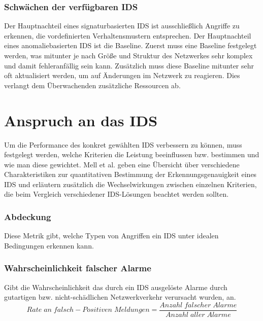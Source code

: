 \subsubsection{Schwächen der verfügbaren IDS}
Der Hauptnachteil eines signaturbasierten IDS ist ausschließlich Angriffe zu erkennen, die vordefinierten Verhaltensmustern entsprechen. Der Hauptnachteil eines anomaliebasierten IDS ist die Baseline. Zuerst muss eine Baseline festgelegt werden, was mitunter je nach Größe und Struktur des Netzwerkes sehr komplex und damit fehleranfällig sein kann. Zusätzlich muss diese Baseline mitunter sehr oft aktualisiert werden, um auf Änderungen im Netzwerk zu reagieren. Dies verlangt dem Überwachenden zusätzliche Ressourcen ab.
\section{Anspruch an das IDS}
Um die Performance des konkret gewählten IDS verbessern zu können, muss festgelegt werden, welche Kriterien die Leistung beeinflussen bzw. bestimmen und wie man diese gewichtet.
Mell et al. \cite{mell2003overview} geben eine Übersicht über verschiedene Charakteristiken zur quantitativen Bestimmung der Erkennungsgenauigkeit eines IDS und erläutern zusätzlich die Wechselwirkungen zwischen einzelnen Kriterien, die beim Vergleich verschiedener IDS-Lösungen beachtet werden sollten.
\subsubsection{Abdeckung}
Diese Metrik gibt, welche Typen von Angriffen ein IDS unter idealen Bedingungen erkennen kann.
\subsubsection{Wahrscheinlichkeit falscher Alarme}
Gibt die Wahrscheinlichkeit das durch ein IDS ausgelöste Alarme durch gutartigen bzw. nicht-schädlichen Netzwerkverkehr verursacht wurden, an.\\
\[Rate\;an\;falsch-Positiven\;Meldungen = \frac{Anzahl\;falscher\;Alarme}{Anzahl\;aller\;Alarme}\]
